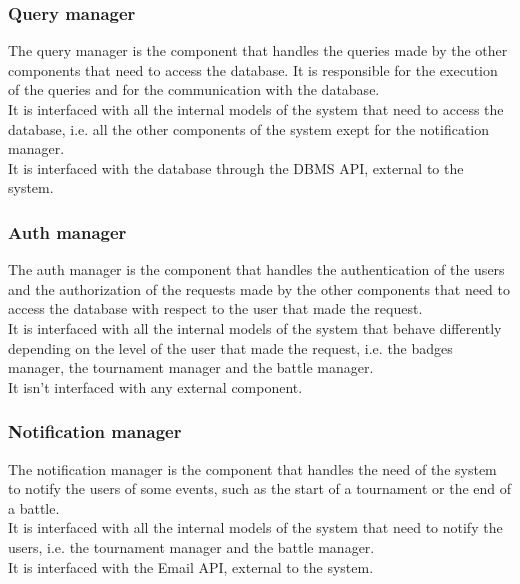 \subsubsection*{Query manager}
The query manager is the component that handles the queries made by the other components that need to access the database. It is responsible for the execution of the queries and for the communication with the database.\\
It is interfaced with all the internal models of the system that need to access the database, i.e. all the other components of the system exept for the notification manager.\\
It is interfaced with the database through the DBMS API, external to the system.

\subsubsection*{Auth manager}
The auth manager is the component that handles the authentication of the users and the authorization of the requests made by the other components that need to access the database with respect to the user that made the request.\\
It is interfaced with all the internal models of the system that behave differently depending on the level of the user that made the request, i.e. the badges manager, the tournament manager and the battle manager.\\
It isn't interfaced with any external component.

\subsubsection*{Notification manager}
The notification manager is the component that handles the need of the system to notify the users of some events, such as the start of a tournament or the end of a battle.\\
It is interfaced with all the internal models of the system that need to notify the users, i.e. the tournament manager and the battle manager.\\
It is interfaced with the Email API, external to the system.


